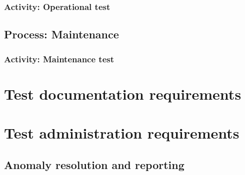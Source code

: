 		\subsubsection{Activity: Operational test} \label{s:details-of-the-master-test-plan:activity-operational-test}
		
	\subsection{Process: Maintenance} \label{s:details-of-the-master-test-plan:process-maintenance}
		
		\subsubsection{Activity: Maintenance test} \label{s:details-of-the-master-test-plan:activity-maintenance-test}
		  
\section{Test documentation requirements} \label{s:details-of-the-master-test-plan:test-documentation-requirements}
	\begin{comment}
		$<$Define the purpose, format, and content of all other testing documents that are to be used (in addition to those that are defined in MTP Section 2.4). A description of these documents may be found in Clause 9 through Clause 16. If the test effort uses test documentation or test levels different from those in this standard (i.e., component, component integration, system, and acceptance), this section needs to map the documentation and process requirements to the test documentation contents defined in this standard. $>$
	\end{comment}
	
\section{Test administration requirements} \label{s:details-of-the-master-test-plan:test-administration-requirements}
	\begin{comment}
		$<$ Describe the anomaly resolution and reporting processes, task iteration policy, deviation policy, control procedures and standards, practices, and conventions. These activities are needed to administer the tests during execution. $>$
	\end{comment}
	
\subsection{Anomaly resolution and reporting} \label{s:details-of-the-master-test-plan:anomaly-resolution-and-reporting}
	\begin{comment}
		$<$ Describe the method of reporting and resolving anomalies, including the standards for reporting an anomaly, the Anomaly Report distribution list, and the authority and time line for resolving anomalies. This section of the plan defines the anomaly criticality levels. Classification for software anomalies may be found in IEEE Std 1044TM-1993. $>$
	\end{comment}
	
